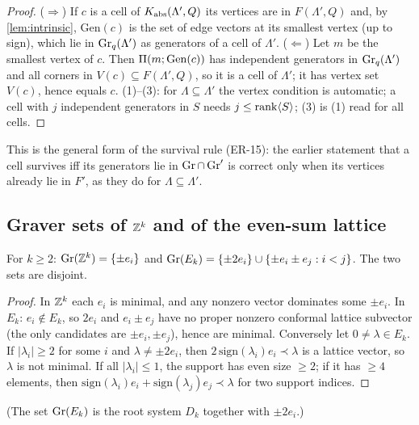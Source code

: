 \begin{proof}
($\Rightarrow$) If $c$ is a cell of $K_{\mathrm{abs}}(\Lambda',Q)$ its vertices are in $F(\Lambda',Q)$ and, by \cref{lem:intrinsic}, $\mathrm{Gen}(c)$ is the set of edge vectors at its smallest vertex (up to sign), which lie in $\operatorname{Gr}_q(\Lambda')$ as generators of a cell of $\Lambda'$. ($\Leftarrow$) Let $m$ be the smallest vertex of $c$. Then $\Pi(m;\mathrm{Gen}(c))$ has independent generators in $\operatorname{Gr}_q(\Lambda')$ and all corners in $V(c)\subseteq F(\Lambda',Q)$, so it is a cell of $\Lambda'$; it has vertex set $V(c)$, hence equals $c$. (1)--(3): for $\Lambda\subseteq\Lambda'$ the vertex condition is automatic; a cell with $j$ independent generators in $S$ needs $j\le\operatorname{rank}\langle S\rangle$; (3) is (1) read for all cells. \qedhere
\end{proof}
This is the general form of the survival rule (ER-15): the earlier statement that a cell survives iff its generators lie in $\operatorname{Gr}\cap\operatorname{Gr}'$ is correct only when its vertices already lie in $F'$, as they do for $\Lambda\subseteq\Lambda'$.

\subsection{Graver sets of \texorpdfstring{$\mathbb Z^k$}{Z\^{}k} and of the even-sum lattice}
\begin{proposition}\label{prop:E25}
For $k\ge2$: $\operatorname{Gr}(\mathbb Z^k)=\{\pm e_i\}$ and $\operatorname{Gr}(E_k)=\{\pm2e_i\}\cup\{\pm e_i\pm e_j:i<j\}$. The two sets are disjoint.
\end{proposition}
\begin{proof}
In $\mathbb Z^k$ each $e_i$ is minimal, and any nonzero vector dominates some $\pm e_i$. In $E_k$: $e_i\notin E_k$, so $2e_i$ and $e_i\pm e_j$ have no proper nonzero conformal lattice subvector (the only candidates are $\pm e_i,\pm e_j$), hence are minimal. Conversely let $0\ne\lambda\in E_k$. If $|\lambda_i|\ge2$ for some $i$ and $\lambda\ne\pm2e_i$, then $2\,\mathrm{sign}(\lambda_i)e_i\prec\lambda$ is a lattice vector, so $\lambda$ is not minimal. If all $|\lambda_i|\le1$, the support has even size $\ge2$; if it has $\ge4$ elements, then $\mathrm{sign}(\lambda_i)e_i+\mathrm{sign}(\lambda_j)e_j\prec\lambda$ for two support indices. \qedhere
\end{proof}
(The set $\operatorname{Gr}(E_k)$ is the root system $D_k$ together with $\pm2e_i$.)


